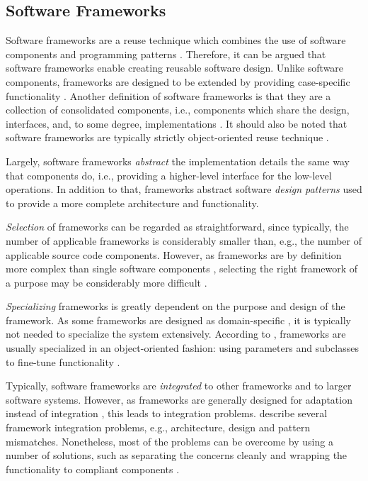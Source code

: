 \subsection{Software Frameworks}

Software frameworks are a reuse technique which combines the use of software components and programming patterns \citep{johnson_frameworkscomponents+_1997}. Therefore, it can be argued that software frameworks enable creating reusable software design. Unlike software components, frameworks are designed to be extended by providing case-specific functionality \citep{lambeau_software_2011}. Another definition of software frameworks is that they are a collection of consolidated components, i.e., components which share the design, interfaces, and, to some degree, implementations \citep{johnson_frameworkscomponents+_1997}. It should also be noted that software frameworks are typically strictly object-oriented reuse technique \citep{johnson_frameworkscomponents+_1997}.

Largely, software frameworks \emph{abstract} the implementation details the same way that components do, i.e., providing a higher-level interface for the low-level operations. In addition to that, frameworks abstract software \emph{design patterns} used to provide a more complete architecture and functionality.

\emph{Selection} of frameworks can be regarded as straightforward, since typically, the number of applicable frameworks is considerably smaller than, e.g., the number of applicable source code components. However, as frameworks are by definition more complex than single software components \citep{johnson_frameworkscomponents+_1997}, selecting the right framework of a purpose may be considerably more difficult \citep{fayad_enterprise_2000}.

\emph{Specializing} frameworks is greatly dependent on the purpose and design of the framework. As some frameworks are designed as domain-specific \citep{johnson_frameworkscomponents+_1997}, it is typically not needed to specialize the system extensively. According to \citet{brugali_framework_1997}, frameworks are usually specialized in an object-oriented fashion: using parameters and subclasses to fine-tune functionality \citep{brugali_framework_1997}.

Typically, software frameworks are \emph{integrated} to other frameworks and to larger software systems. However, as frameworks are generally designed for adaptation instead of integration \citep{mattsson_framework_1999}, this leads to integration problems. \citet{mattsson_framework_1999} describe several framework integration problems, e.g., architecture, design and pattern mismatches. Nonetheless, most of the problems can be overcome by using a number of solutions, such as separating the concerns cleanly and wrapping the functionality to compliant components \citep{mattsson_framework_1999}.

